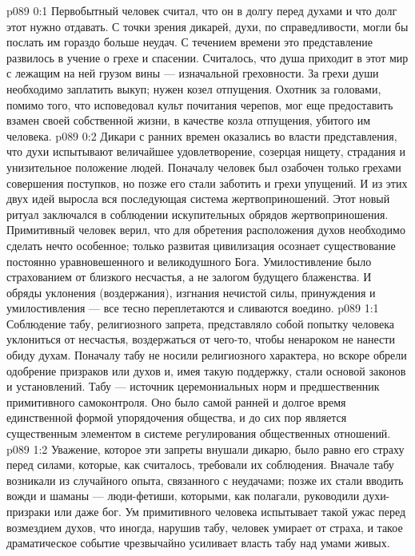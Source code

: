\author{Блестящая Вечерняя Звезда}
\vs p089 0:1 Первобытный человек считал, что он в долгу перед духами и что долг этот нужно отдавать. С точки зрения дикарей, духи, по справедливости, могли бы послать им гораздо больше неудач. С течением времени это представление развилось в учение о грехе и спасении. Считалось, что душа приходит в этот мир с лежащим на ней грузом вины --- изначальной греховности. За грехи души необходимо заплатить выкуп; нужен козел отпущения. Охотник за головами, помимо того, что исповедовал культ почитания черепов, мог еще предоставить взамен своей собственной жизни, в качестве козла отпущения, убитого им человека.
\vs p089 0:2 Дикари с ранних времен оказались во власти представления, что духи испытывают величайшее удовлетворение, созерцая нищету, страдания и унизительное положение людей. Поначалу человек был озабочен только грехами совершения поступков, но позже его стали заботить и грехи упущений. И из этих двух идей выросла вся последующая система жертвоприношений. Этот новый ритуал заключался в соблюдении искупительных обрядов жертвоприношения. Примитивный человек верил, что для обретения расположения духов необходимо сделать нечто особенное; только развитая цивилизация осознает существование постоянно уравновешенного и великодушного Бога. Умилостивление было страхованием от близкого несчастья, а не залогом будущего блаженства. И обряды уклонения (воздержания), изгнания нечистой силы, принуждения и умилостивления --- все тесно переплетаются и сливаются воедино.
\vs p089 1:1 Соблюдение табу, религиозного запрета, представляло собой попытку человека уклониться от несчастья, воздержаться от чего\hyp{}то, чтобы ненароком не нанести обиду духам. Поначалу табу не носили религиозного характера, но вскоре обрели одобрение призраков или духов и, имея такую поддержку, стали основой законов и установлений. Табу --- источник церемониальных норм и предшественник примитивного самоконтроля. Оно было самой ранней и долгое время единственной формой упорядочения общества, и до сих пор является существенным элементом в системе регулирования общественных отношений.
\vs p089 1:2 Уважение, которое эти запреты внушали дикарю, было равно его страху перед силами, которые, как считалось, требовали их соблюдения. Вначале табу возникали из случайного опыта, связанного с неудачами; позже их стали вводить вожди и шаманы --- люди\hyp{}фетиши, которыми, как полагали, руководили духи\hyp{}призраки или даже бог. Ум примитивного человека испытывает такой ужас перед возмездием духов, что иногда, нарушив табу, человек умирает от страха, и такое драматическое событие чрезвычайно усиливает власть табу над умами живых.
